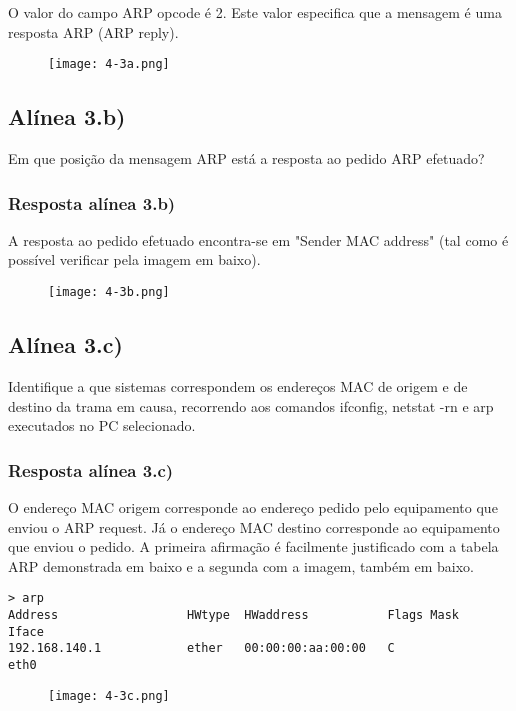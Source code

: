\documentclass{article}
\begin{document}
O valor do campo ARP opcode é 2. Este valor especifica que a mensagem é uma resposta ARP (ARP reply).
\begin{figure}[h]
    \centering
    \texttt{[image: 4-3a.png]}
\end{figure}

\subsection{Alínea 3.b)}

Em que posição da mensagem ARP está a resposta ao pedido ARP efetuado?

\subsubsection{Resposta alínea 3.b)}

A resposta ao pedido efetuado encontra-se em "Sender MAC address" (tal como é possível verificar pela imagem em baixo).
\begin{figure}[h]
    \centering
    \texttt{[image: 4-3b.png]}
\end{figure}

\subsection{Alínea 3.c)}

Identifique a que sistemas correspondem os endereços MAC de origem e de destino da trama em causa, recorrendo aos comandos ifconfig, netstat -rn e arp executados no PC selecionado.

\subsubsection{Resposta alínea 3.c)}

O endereço MAC origem corresponde ao endereço pedido pelo equipamento que enviou o ARP request. Já o endereço MAC destino corresponde ao equipamento que enviou o pedido. A primeira afirmação é facilmente justificado com a tabela ARP demonstrada em baixo e a segunda com a imagem, também em baixo.
\begin{lstlisting}
> arp
Address                  HWtype  HWaddress           Flags Mask            Iface
192.168.140.1            ether   00:00:00:aa:00:00   C                     eth0
\end{lstlisting}
\begin{figure}[h]
    \centering
    \texttt{[image: 4-3c.png]}
\end{figure}
\end{document}
